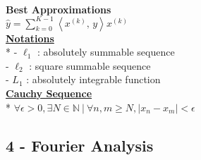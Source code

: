 \documentclass{article}
\newcommand{\ip}[2]{\left \langle #1, \, #2 \right \rangle} %
\newcommand{\para}[1]{\textbf{\underline{#1}}\\*} %
\newcommand{\subpara}[1]{\textbf{#1}}
\begin{document}
\begin{multicols}{3}
\\ \subpara{Best Approximations}\\ $\hat{y}  = \displaystyle \sum_{k=0}^{K-1} \ip{x^{(k)}}y x^{(k)} $
\\
\para{Notations}
- $\ell_1$ : absolutely summable sequence\\
- $\ell_2$ : square summable sequence\\
- $L_1$ : absolutely integrable function
\\
\para{Cauchy Sequence}
$ \forall \epsilon >0, \exists N\in \mathbb{N}\ |\ \forall n,m \geq N, |x_n - x_m|< \epsilon$


\end{multicols}

\subsection{4 - Fourier Analysis}
\end{document}
